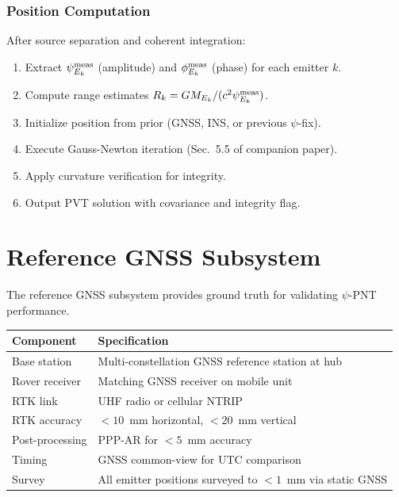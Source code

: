 \documentclass[11pt,a4paper]{article}
\begin{document}
\subsubsection{Position Computation}

After source separation and coherent integration:
\begin{enumerate}
\item Extract $\psi_{E_k}^{\rm meas}$ (amplitude) and
  $\phi_{E_k}^{\rm meas}$ (phase) for each emitter $k$.
\item Compute range estimates $R_k = GM_{E_k}/(c^2\psi_{E_k}^{\rm meas})$.
\item Initialize position from prior (GNSS, INS, or previous $\psi$-fix).
\item Execute Gauss-Newton iteration (Sec.~5.5 of companion paper).
\item Apply curvature verification for integrity.
\item Output PVT solution with covariance and integrity flag.
\end{enumerate}

\section{Reference GNSS Subsystem}

The reference GNSS subsystem provides ground truth for validating
$\psi$-PNT performance.

\begin{longtable}{p{5cm}p{8cm}}
\toprule
\textbf{Component} & \textbf{Specification} \\
\midrule
\endfirsthead
Base station & Multi-constellation GNSS reference station at hub \\
Rover receiver & Matching GNSS receiver on mobile unit \\
RTK link & UHF radio or cellular NTRIP \\
RTK accuracy & $< 10$~mm horizontal, $< 20$~mm vertical \\
Post-processing & PPP-AR for $< 5$~mm accuracy \\
Timing & GNSS common-view for UTC comparison \\
Survey & All emitter positions surveyed to $< 1$~mm via static GNSS \\
\bottomrule
\end{longtable}
\end{document}
